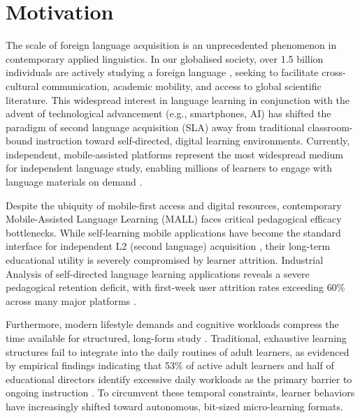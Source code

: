 \section{Motivation}

The scale of foreign language acquisition is an unprecedented phenomenon in contemporary applied linguistics. In our globalised society, over 1.5 billion individuals are actively studying a foreign language \cite{kentstate2025language}, seeking to facilitate cross-cultural communication, academic mobility, and access to global scientific literature. This widespread interest in language learning in conjunction with the advent of technological advancement (e.g., smartphones, AI) has shifted the paradigm of second language acquisition (SLA) away from traditional classroom-bound instruction toward self-directed, digital learning environments. Currently, independent, mobile-assisted platforms represent the most widespread medium for independent language study, enabling millions of learners to engage with language materials on demand \cite{mordor2026language}.

Despite the ubiquity of mobile-first access and digital resources, contemporary Mobile-Assisted Language Learning (MALL) faces critical pedagogical efficacy bottlenecks. While self-learning mobile applications have become the standard interface for independent L2 (second language) acquisition \cite{mordor2026language}, their long-term educational utility is severely compromised by learner attrition. Industrial Analysis of self-directed language learning applications reveals a severe pedagogical retention deficit, with first-week user attrition rates exceeding 60\% across many major platforms \cite{mordor2026language}.

Furthermore, modern lifestyle demands and cognitive workloads compress the time available for structured, long-form study \cite{talentlms2026}. Traditional, exhaustive learning structures fail to integrate into the daily routines of adult learners, as evidenced by empirical findings indicating that 53\% of active adult learners and half of educational directors identify excessive daily workloads as the primary barrier to ongoing instruction \cite{talentlms2026}. To circumvent these temporal constraints, learner behaviors have increasingly shifted toward autonomous, bit-sized micro-learning formats.

